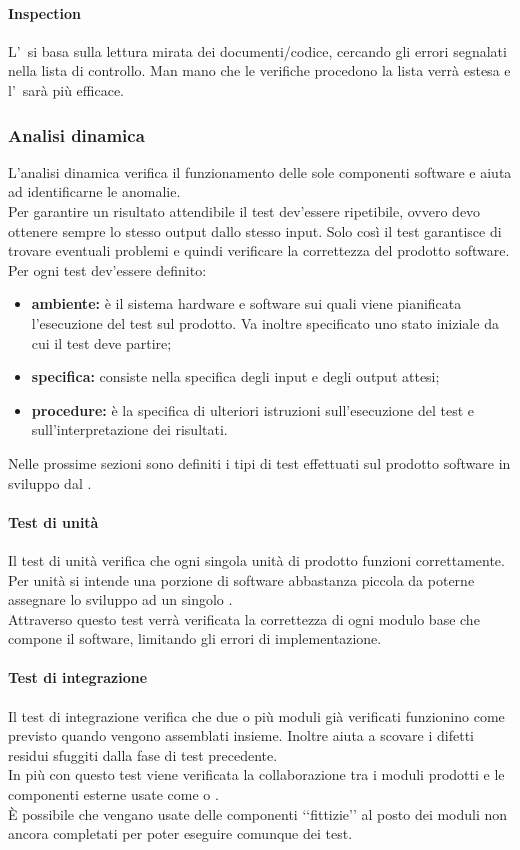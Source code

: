 			\paragraph{Inspection}
				L'\ si basa sulla lettura mirata dei documenti/codice, cercando gli errori segnalati nella lista di controllo. Man mano che le verifiche procedono la lista verrà estesa e l'\ sarà più efficace.
		\subsubsection{Analisi dinamica}
			L'analisi dinamica verifica il funzionamento delle sole componenti software e aiuta ad identificarne le anomalie. \\
			Per garantire un risultato attendibile il test dev'essere ripetibile, ovvero devo ottenere sempre lo stesso output dallo stesso input. Solo così il test garantisce di trovare eventuali problemi e quindi verificare la correttezza del prodotto software. \\
			Per ogni test dev'essere definito:
			\begin{itemize}
				\item \textbf{ambiente:} è il sistema hardware e software sui quali viene pianificata l'esecuzione del test sul prodotto. Va inoltre specificato uno stato iniziale da cui il test deve partire;
				\item \textbf{specifica:} consiste nella specifica degli input e degli output attesi;
				\item \textbf{procedure:} è la specifica di ulteriori istruzioni sull'esecuzione del test e sull'interpretazione dei risultati.
			\end{itemize}
			Nelle prossime sezioni sono definiti i tipi di test effettuati sul prodotto software in sviluppo dal .
			\paragraph{Test di unità}
				Il test di unità verifica che ogni singola unità di prodotto funzioni correttamente. Per unità si intende una porzione di software abbastanza piccola da poterne assegnare lo sviluppo ad un singolo \PR. \\
				Attraverso questo test verrà verificata la correttezza di ogni modulo base che compone il software, limitando gli errori di implementazione.
			\paragraph{Test di integrazione}
				Il test di integrazione verifica che due o più moduli già verificati funzionino come previsto quando vengono assemblati insieme. Inoltre aiuta a scovare i difetti residui sfuggiti dalla fase di test precedente. \\
				In più con questo test viene verificata la collaborazione tra i moduli prodotti e le componenti esterne usate come  o . \\
				È possibile che vengano usate delle componenti ‘‘fittizie’’ al posto dei moduli non ancora completati per poter eseguire comunque dei test.
